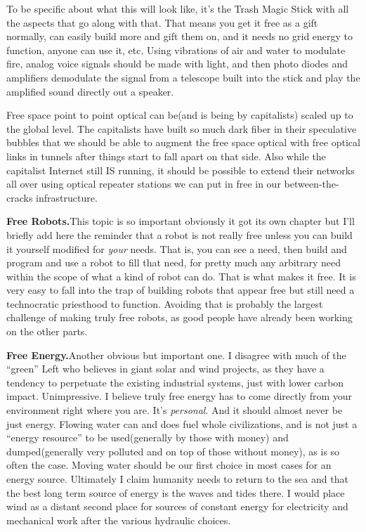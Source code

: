 To be specific about what this will look like, it's the Trash Magic
Stick with all the aspects that go along with that. That means you get
it free as a gift normally, can easily build more and gift them on, and
it needs no grid energy to function, anyone can use it, etc. Using
vibrations of air and water to modulate fire, analog voice signals
should be made with light, and then photo diodes and amplifiers
demodulate the signal from a telescope built into the stick and play the
amplified sound directly out a speaker.

Free space point to point optical can be(and is being by capitalists)
scaled up to the global level. The capitalists have built so much dark
fiber in their speculative bubbles that we should be able to augment the
free space optical with free optical links in tunnels after things start
to fall apart on that side. Also while the capitalist Internet still IS
running, it should be possible to extend their networks all over using
optical repeater stations we can put in free in our between-the-cracks
infrastructure.

\textbf{Free Robots.}This topic is so important obviously it got its own
chapter but I'll briefly add here the reminder that a robot is not
really free unless you can build it yourself modified for \emph{your}
needs. That is, you can see a need, then build and program and use a
robot to fill that need, for pretty much any arbitrary need within the
scope of what a kind of robot can do. That is what makes it free. It is
very easy to fall into the trap of building robots that appear free but
still need a technocratic priesthood to function. Avoiding that is
probably the largest challenge of making truly free robots, as good
people have already been working on the other parts.

\textbf{Free Energy.}Another obvious but important one. I disagree with
much of the ``green'' Left who believes in giant solar and wind
projects, as they have a tendency to perpetuate the existing industrial
systems, just with lower carbon impact. Unimpressive. I believe truly
free energy has to come directly from your environment right where you
are. It's \emph{personal}. And it should almost never be just energy.
Flowing water can and does fuel whole civilizations, and is not just a
``energy resource'' to be used(generally by those with money) and
dumped(generally very polluted and on top of those without money), as is
so often the case. Moving water should be our first choice in most cases
for an energy source. Ultimately I claim humanity needs to return to the
sea and that the best long term source of energy is the waves and tides
there. I would place wind as a distant second place for sources of
constant energy for electricity and mechanical work after the various
hydraulic choices.

